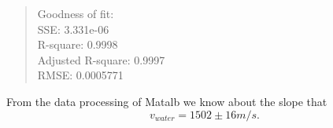 \begin{quote}
Goodness of fit:\\
  SSE: 3.331e-06                \\
  R-square: 0.9998              \\
  Adjusted R-square: 0.9997     \\
  RMSE: 0.0005771               
\end{quote}

From the data processing of Matalb we know about the slope that 
\[
    v_{water}=1502 \pm 16 m/s.
\]